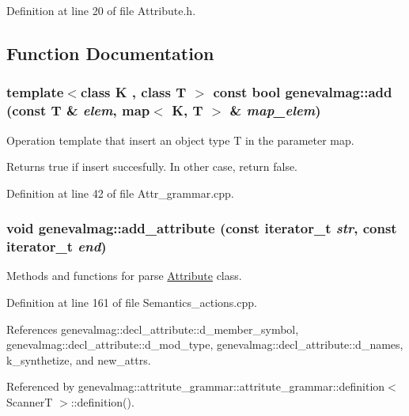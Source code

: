 Definition at line 20 of file Attribute.h.

\subsection{Function Documentation}
\hypertarget{namespacegenevalmag_95d75ecfcb4371b57086093c66a96bd4}{
\subsubsection[{add}]{\setlength{\rightskip}{0pt plus 5cm}template$<$class K , class T $>$ const bool genevalmag::add (const T \& {\em elem}, \/  map$<$ K, T $>$ \& {\em map\_\-elem})}}
\label{namespacegenevalmag_95d75ecfcb4371b57086093c66a96bd4}


Operation template that insert an object type T in the parameter map.

Returns true if insert succesfully. In other case, return false. 

Definition at line 42 of file Attr\_\-grammar.cpp.\hypertarget{namespacegenevalmag_92edf3022d197c1c9587126d1aea5c9f}{
\subsubsection[{add\_\-attribute}]{\setlength{\rightskip}{0pt plus 5cm}void genevalmag::add\_\-attribute (const iterator\_\-t {\em str}, \/  const iterator\_\-t {\em end})}}
\label{namespacegenevalmag_92edf3022d197c1c9587126d1aea5c9f}


Methods and functions for parse \hyperlink{classgenevalmag_1_1Attribute}{Attribute} class. 

Definition at line 161 of file Semantics\_\-actions.cpp.

References genevalmag::decl\_\-attribute::d\_\-member\_\-symbol, genevalmag::decl\_\-attribute::d\_\-mod\_\-type, genevalmag::decl\_\-attribute::d\_\-names, k\_\-synthetize, and new\_\-attrs.

Referenced by genevalmag::attritute\_\-grammar::attritute\_\-grammar::definition$<$ ScannerT $>$::definition().


